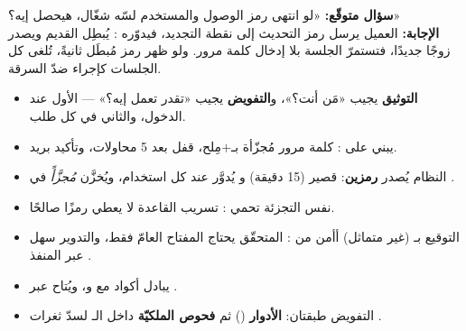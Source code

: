 \begin{qa}
\textbf{سؤال متوقّع:} «لو انتهى رمز الوصول والمستخدم لسّه شغّال، هيحصل إيه؟»\\
\textbf{الإجابة:} العميل يرسل رمز التحديث إلى نقطة التجديد، فيدوّره
: يُبطِل القديم ويصدر زوجًا جديدًا، فتستمرّ الجلسة بلا
إدخال كلمة مرور. ولو ظهر رمز مُبطَل ثانيةً، تُلغى كل الجلسات كإجراء ضدّ السرقة.
\end{qa}

\begin{summary}
\begin{itemize}
\item \textbf{التوثيق} يجيب «مَن أنت؟»، و\textbf{التفويض} يجيب «تقدر تعمل إيه؟» —
  الأول عند الدخول، والثاني في كل طلب.
\item {} يبني على :
  كلمة مرور مُجزّأة بـ$+$مِلح، قفل بعد 5 محاولات، وتأكيد بريد.
\item النظام يُصدر \textbf{رمزين}:  قصير (15 دقيقة) و
  يُدوَّر عند كل استخدام، ويُخزَّن \emph{مُجزَّأً} في .
\item نفس التجزئة تحمي : تسريب القاعدة لا يعطي رمزًا صالحًا.
\item التوقيع بـ (غير متماثل) أأمن من : المتحقّق يحتاج المفتاح
  العامّ فقط، والتدوير سهل عبر المنفذ .
\item {} يبادل أكواد  مع  و،
  ويُتاح  عبر .
\item التفويض طبقتان: \textbf{الأدوار} ()
  ثم \textbf{فحوص الملكيّة} داخل الـ لسدّ ثغرات .
\end{itemize}
\end{summary}
